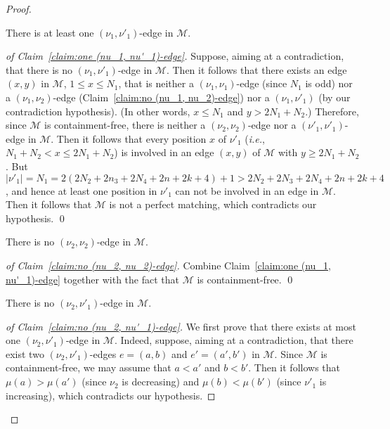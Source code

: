\documentclass[a4paper,10pt]{llncs}
\begin{document}
\begin{proof}
  \begin{claim}
    \label{claim:one (nu_1, nu'_1)-edge}
    There is at least one $(\nu_1, \nu'_1)$-edge in $\mathcal{M}$.
  \end{claim}

  \begin{proof}[of Claim~\ref{claim:one (nu_1, nu'_1)-edge}]
    Suppose, aiming at a contradiction, that there is no
    $(\nu_1, \nu'_1)$-edge in $\mathcal{M}$.
    Then it follows that there exists an edge $(x, y)$ in $\mathcal{M}$,
    $1 \leq x \leq N_1$, that is neither a
    $(\nu_1, \nu_1)$-edge (since $N_1$ is odd)
    nor a $(\nu_1, \nu_2)$-edge (Claim~\ref{claim:no (nu_1, nu_2)-edge})
    nor a $(\nu_1, \nu'_1)$ (by our contradiction hypothesis).
    (In other words, $x \leq N_1$ and $y > 2N_1 + N_2$.)
    Therefore, since $\mathcal{M}$ is containment-free,
    there is neither a $(\nu_2, \nu_2)$-edge nor a $(\nu'_1, \nu'_1)$-edge
    in $\mathcal{M}$.
    Then it follows that every position $x$ of $\nu'_1$
    (\emph{i.e.}, $N_1+N_2 < x \leq 2N_1+N_2$)
    is involved in an edge $(x, y)$ of $\mathcal{M}$ with $y \geq 2N_1+N_2$.
    But $|\nu'_1| = N_1 = 2(2N_2 + 2n_3 + 2N_4 + 2n + 2k + 4) + 1
    > 2N_2 + 2N_3 + 2N_4 + 2n + 2k + 4$, and hence at least one
    position in $\nu'_1$ can not be involved in an edge in $\mathcal{M}$.
    Then it follows that $\mathcal{M}$ is not a perfect matching,
    which contradicts our hypothesis.
    \qed
  \end{proof}

  \begin{claim}
    \label{claim:no (nu_2, nu_2)-edge}
    There is no $(\nu_2, \nu_2)$-edge in $\mathcal{M}$.
  \end{claim}

  \begin{proof}[of Claim~\ref{claim:no (nu_2, nu_2)-edge}]
  Combine Claim~\ref{claim:one (nu_1, nu'_1)-edge} together with
  the fact that $\mathcal{M}$ is containment-free.
  \qed
  \end{proof}

  \begin{claim}
    \label{claim:no (nu_2, nu'_1)-edge}
    There is no $(\nu_2, \nu'_1)$-edge in $\mathcal{M}$.
  \end{claim}

  \begin{proof}[of Claim~\ref{claim:no (nu_2, nu'_1)-edge}]
    We first prove that there exists at most one
    $(\nu_2, \nu'_1)$-edge in $\mathcal{M}$.
    Indeed, suppose, aiming at a contradiction, that there exist
    two $(\nu_2, \nu'_1)$-edges $e = (a, b)$ and $e' = (a', b')$ in $\mathcal{M}$.
    Since $\mathcal{M}$ is containment-free,
    we may assume that $a < a'$ and $b < b'$.
    Then it follows that $\mu(a) > \mu(a')$
    (since $\nu_2$ is decreasing) and $\mu(b) < \mu(b')$
    (since $\nu'_1$ is increasing),
    which contradicts our hypothesis.


\end{proof}
\end{proof}
\end{document}
